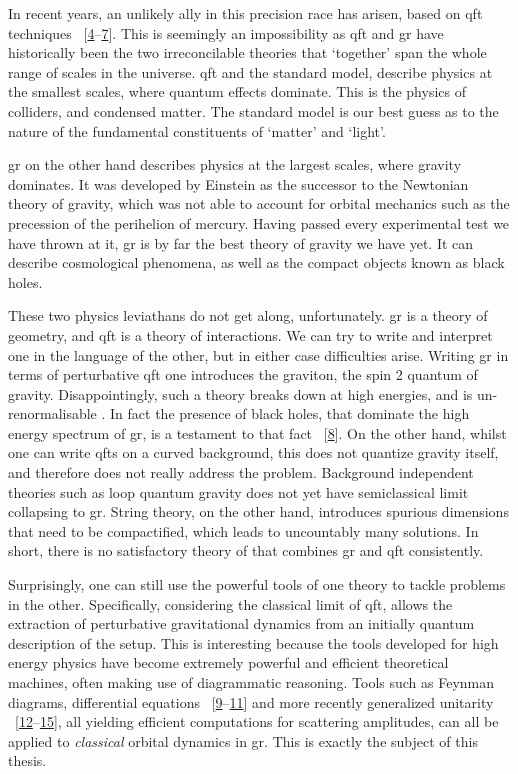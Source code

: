 \documentclass[
  10pt,
  a4paper,
  DIV=11,
  numbers=noendperiod,
  twoside]{scrreprt}
\DeclareRobustCommand{\[}{\begin{equation}}
\DeclareRobustCommand{\]}{\end{equation}}
\begin{document}
In recent years, an unlikely ally in this precision race has arisen,
based on \gls{qft} techniques
~{[}\protect\hyperlink{ref-Goldberger:2004jt}{4}--\protect\hyperlink{ref-Neill:2013wsa}{7}{]}.
This is seemingly an impossibility as \gls{qft} and \gls{gr} have
historically been the two irreconcilable theories that `together' span
the whole range of scales in the universe. \gls{qft} and the standard
model, describe physics at the smallest scales, where quantum effects
dominate. This is the physics of colliders, and condensed matter. The
standard model is our best guess as to the nature of the fundamental
constituents of `matter' and `light'.

\gls{gr} on the other hand describes physics at the largest scales,
where gravity dominates. It was developed by Einstein as the successor
to the Newtonian theory of gravity, which was not able to account for
orbital mechanics such as the precession of the perihelion of mercury.
Having passed every experimental test we have thrown at it, \gls{gr} is
by far the best theory of gravity we have yet. It can describe
cosmological phenomena, as well as the compact objects known as black
holes.

These two physics leviathans do not get along, unfortunately. \gls{gr}
is a theory of geometry, and \gls{qft} is a theory of interactions. We
can try to write and interpret one in the language of the other, but in
either case difficulties arise. Writing \gls{gr} in terms of
perturbative \gls{qft} one introduces the graviton, the spin 2 quantum
of gravity. Disappointingly, such a theory breaks down at high energies,
and is un-renormalisable . In fact the presence of black holes, that
dominate the high energy spectrum of \gls{gr}, is a testament to that
fact ~{[}\protect\hyperlink{ref-Shomer:2007vq}{8}{]}. On the other hand,
whilst one can write \glspl{qft} on a curved background, this does not
quantize gravity itself, and therefore does not really address the
problem. Background independent theories such as loop quantum gravity
does not yet have semiclassical limit collapsing to \gls{gr}. String
theory, on the other hand, introduces spurious dimensions that need to
be compactified, which leads to uncountably many solutions. In short,
there is no satisfactory theory of that combines \gls{gr} and \gls{qft}
consistently.

Surprisingly, one can still use the powerful tools of one theory to
tackle problems in the other. Specifically, considering the classical
limit of \gls{qft}, allows the extraction of perturbative gravitational
dynamics from an initially quantum description of the setup. This is
interesting because the tools developed for high energy physics have
become extremely powerful and efficient theoretical machines, often
making use of diagrammatic reasoning. Tools such as Feynman diagrams,
differential equations
~{[}\protect\hyperlink{ref-Remiddi:1997ny}{9}--\protect\hyperlink{ref-Kotikov:1990kg}{11}{]}
and more recently generalized unitarity
~{[}\protect\hyperlink{ref-Bern:1994cg}{12}--\protect\hyperlink{ref-Anastasiou:2006jv}{15}{]},
all yielding efficient computations for scattering amplitudes, can all
be applied to \emph{classical} orbital dynamics in \gls{gr}. This is
exactly the subject of this thesis.
\end{document}
